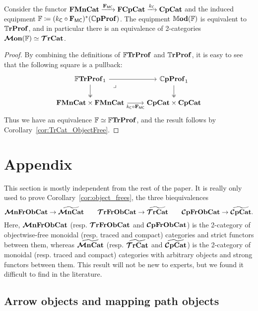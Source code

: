 \documentclass[11pt,oneside,article]{memoir}
\begin{document}
\begin{proposition}
  Consider the functor $\mathbf{FMnCat}\xrightarrow{\mathbf{F}_{\mathsf{MC}}}\mathbf{FCpCat}\xrightarrow{k_{\mathsf{C}}}\mathbf{CpCat}$ and the induced
  equipment $\mathbb{F}\coloneqq(k_{\mathsf{C}}\circ\mathbf{F}_{\mathsf{MC}})^*(\mathbb{C}\mathbf{pProf})$. The equipment
  $\mathbb{M}\mathbf{od}(\mathbb{F})$ is equivalent to $\mathbb{T}\mathbf{rProf}$, and in particular there is an equivalence of
  2-categories $\bm{\mathcal{M}}\mathbf{on}(\mathbb{F})\simeq\bm{\mathcal{T}}\mathbf{rCat}$.
\end{proposition}
\begin{proof}
  By combining the definitions of $\mathbb{F}\mathbf{TrProf}$ and $\mathbb{T}\mathbf{rProf}$, it is easy to see that the following
  square is a pullback:
  \begin{equation} \begin{tikzcd}
      \label{eqn:FTrProf_pullback}
    \dFrTrProf_1 \ar[r] \ar[d,two heads] \ar[dr,phantom,"\lrcorner" very near start]
      & \dCompProf_1 \ar[d,two heads] \\
    \FrMonCat\times\FrMonCat \ar[r,"k_{\MTCfont{C}}\circ\FMC"']
      & \CompCat\times\CompCat
  \end{tikzcd} \end{equation}
  Thus we have an equivalence $\mathbb{F}\simeq\mathbb{F}\mathbf{TrProf}$, and the result follows by
  Corollary~\ref{cor:TrCat_ObjectFree}.
\end{proof}

\appendix
\chapter{Appendix}
  \label{appendix}

This section is mostly independent from the rest of the paper. It is really only used to prove
Corollary~\ref{cor:object_frees}, the three biequivalences
\[
  \bm{\mathcal{M}}\mathbf{nFrObCat} \to \widetilde{\bm{\mathcal{M}}\mathbf{nCat}} \qquad
  \bm{\mathcal{T}}\mathbf{rFrObCat} \to \widetilde{\bm{\mathcal{T}}\mathbf{rCat}} \qquad
  \bm{\mathcal{C}}\mathbf{pFrObCat} \to \widetilde{\bm{\mathcal{C}}\mathbf{pCat}}.
\]
Here, $\bm{\mathcal{M}}\mathbf{nFrObCat}$ (resp. $\bm{\mathcal{T}}\mathbf{rFrObCat}$ and $\bm{\mathcal{C}}\mathbf{pFrObCat}$) is the 2-category of objectwise-free
monoidal (resp. traced and compact) categories and strict functors between them, whereas
$\widetilde{\bm{\mathcal{M}}\mathbf{nCat}}$ (resp. $\widetilde{\bm{\mathcal{T}}\mathbf{rCat}}$ and $\widetilde{\bm{\mathcal{C}}\mathbf{pCat}}$) is the 2-category of monoidal (resp.
traced and compact) categories with arbitrary objects and strong functors between them. This result
will not be new to experts, but we found it difficult to find in the literature.

\section{Arrow objects and mapping path objects}
\end{document}
